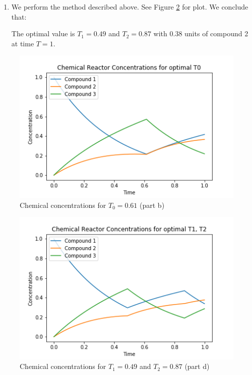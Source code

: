 \documentclass[12pt]{exam}
\begin{document}
\begin{questions}
\begin{solution}
\begin{enumerate}[label=(\alph*)]
        \item
          We perform the method described above. See Figure \ref{fig:chemical_d} for plot. We conclude that:

          The optimal value is $T_1 = 0.49$ and $T_2 = 0.87$ with $0.38$ units of compound 2 at time $T = 1$.
    \end{enumerate}
  \end{solution}

  \begin{figure}[hpb!]
    \centering
    \includegraphics{chemical_reactor_b.png}
    \caption{Chemical concentrations for $T_0 = 0.61$ (part b)}
    \label{fig:chemical_b}
  \end{figure}
  
  \afterpage{\clearpage}
  \begin{figure}
    \centering
    \includegraphics{chemical_reactor_d.png}
    \caption{Chemical concentrations for $T_1 = 0.49$ and $T_2 = 0.87$ (part d)}
    \label{fig:chemical_d}
  \end{figure}



\end{questions}
\end{document}
